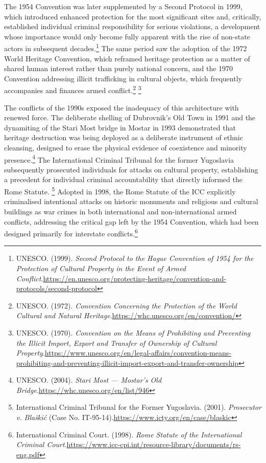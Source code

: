 The 1954 Convention was later supplemented by a Second Protocol in 1999, which introduced enhanced protection for the most significant sites and, critically, established individual criminal responsibility for serious violations, a development whose importance would only become fully apparent with the rise of non-state actors in subsequent decades.\footnote{UNESCO. (1999). \emph{Second Protocol to the Hague Convention of 1954 for the Protection of Cultural Property in the Event of Armed Conflict}.\url{https://en.unesco.org/protecting-heritage/convention-and-protocols/second-protocol}} The same period saw the adoption of the 1972 World Heritage Convention, which reframed heritage protection as a matter of shared human interest rather than purely national concern, and the 1970 Convention addressing illicit trafficking in cultural objects, which frequently accompanies and finances armed conflict.\footnote{UNESCO. (1972). \emph{Convention Concerning the Protection of the World Cultural and Natural Heritage}.\url{https://whc.unesco.org/en/convention/}} \footnote{UNESCO. (1970). \emph{Convention on the Means of Prohibiting and Preventing the Illicit Import, Export and Transfer of Ownership of Cultural Property}.\url{https://www.unesco.org/en/legal-affairs/convention-means-prohibiting-and-preventing-illicit-import-export-and-transfer-ownership}}

The conflicts of the 1990s exposed the inadequacy of this architecture with renewed force. The deliberate shelling of Dubrovnik's Old Town in 1991 and the dynamiting of the Stari Most bridge in Mostar in 1993 demonstrated that heritage destruction was being deployed as a deliberate instrument of ethnic cleansing, designed to erase the physical evidence of coexistence and minority presence.\footnote{UNESCO. (2004). \emph{Stari Most — Mostar's Old Bridge}.\url{https://whc.unesco.org/en/list/946}} The International Criminal Tribunal for the former Yugoslavia subsequently prosecuted individuals for attacks on cultural property, establishing a precedent for individual criminal accountability that directly informed the Rome Statute. \footnote{International Criminal Tribunal for the Former Yugoslavia. (2001). \emph{Prosecutor v. Blaškić} (Case No. IT-95-14).\url{https://www.icty.org/en/case/blaskic}} Adopted in 1998, the Rome Statute of the ICC explicitly criminalised intentional attacks on historic monuments and religious and cultural buildings as war crimes in both international and non-international armed conflicts, addressing the critical gap left by the 1954 Convention, which had been designed primarily for interstate conflicts.\footnote{International Criminal Court. (1998). \emph{Rome Statute of the International Criminal Court}.\url{https://www.icc-cpi.int/resource-library/documents/rs-eng.pdf}}

